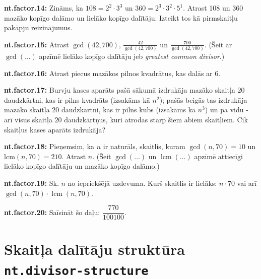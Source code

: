 \documentclass[11pt]{article}
\newenvironment{uzdevums}[1][\unskip]{%
\vspace{3mm}
\noindent
\textbf{#1:}
\noindent}
{}
\begin{document}
\begin{uzdevums}[nt.factor.14]
Zināms, ka $108 = 2^2 \cdot 3^3$ un $360 = 2^3 \cdot 3^2 \cdot 5^1$. 
Atrast 108 un 360 mazāko kopīgo dalāmo un lielāko kopīgo dalītāju. 
Izteikt tos kā pirmskaitļu pakāpju reizinājumus. 
\end{uzdevums}

\begin{uzdevums}[nt.factor.15]
Atrast $\gcd(42, 700)$, $\frac{42}{\gcd(42, 700)}$ un $\frac{700}{\gcd(42, 700)}$. 
(Šeit ar $\operatorname{gcd}(\ldots)$ apzīmē 
lielāko kopīgo dalītāju jeb {\em greatest common divisor}.)
\end{uzdevums}

\begin{uzdevums}[nt.factor.16]
Atrast piecus mazākos pilnos kvadrātus, kas dalās ar $6$.
\end{uzdevums}

\begin{uzdevums}[nt.factor.17]
Burvju kases aparāts pašā sākumā izdrukāja mazāko 
skaitļa $20$ daudzkārtni, 
kas ir pilns kvadrāts (izsakāms kā $n^2$); pašās beigās 
tas izdrukāja mazāko skaitļa $20$ daudzkārtni, 
kas ir pilns kubs (izsakāms kā $n^3$) un pa vidu - arī 
visus skaitļa $20$ daudzkārtņus, 
kuri atrodas starp šiem abiem skaitļiem. 
Cik skaitļus kases aparāts izdrukāja? 
\end{uzdevums}

\begin{uzdevums}[nt.factor.18]
Pieņemsim, ka $n$ ir naturāls, skaitlis, kuram $\gcd(n, 70) = 10$ un $\mathrm{lcm}(n, 70) = 210$. 
Atrast $n$. (Šeit $\gcd(\ldots)$ un $\operatorname{lcm}(\ldots)$
apzīmē attiecīgi lielāko kopīgo dalītāju un mazāko kopīgo dalāmo.)
\end{uzdevums}

\begin{uzdevums}[nt.factor.19]
Sk. $n$ no iepriekšējā uzdevuma. Kurš skaitlis ir lielāks: $n \cdot 70$ vai arī
$\gcd(n, 70) \cdot \operatorname{lcm}(n,70)$.  
\end{uzdevums}

\begin{uzdevums}[nt.factor.20]
Saīsināt šo daļu:
$\dfrac{770}{100100}$.
\end{uzdevums}



\section{Skaitļa dalītāju struktūra \texttt{nt.divisor-structure}}
\end{document}
